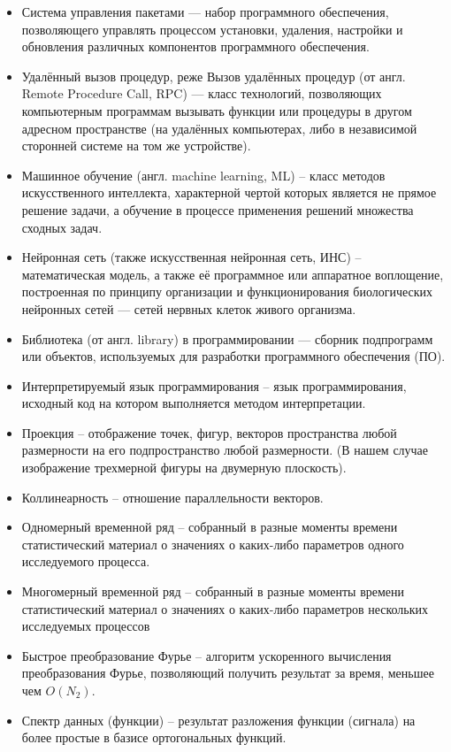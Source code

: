 \begin{itemize}
    \item Система управления пакетами — набор программного обеспечения, позволяющего управлять процессом установки, удаления, настройки и обновления различных компонентов программного обеспечения.
    \item Удалённый вызов процедур, реже Вызов удалённых процедур (от англ. Remote Procedure Call, RPC) — класс технологий, позволяющих компьютерным программам вызывать функции или процедуры в другом адресном пространстве (на удалённых компьютерах, либо в независимой сторонней системе на том же устройстве).
    \item Машинное обучение (англ. machine learning, ML) -- класс методов искусственного интеллекта, характерной чертой которых является не прямое решение задачи, а обучение в процессе применения решений множества сходных задач.
    \item Нейронная сеть (также искусственная нейронная сеть, ИНС) -- математическая модель, а также её программное или аппаратное воплощение, построенная по принципу организации и функционирования биологических нейронных сетей — сетей нервных клеток живого организма.
    \item Библиотека (от англ. library) в программировании — сборник подпрограмм или объектов, используемых для разработки программного обеспечения (ПО).
    \item Интерпретируемый язык программирования -- язык программирования, исходный код на котором выполняется методом интерпретации.
    \item Проекция -- отображение точек, фигур, векторов пространства любой размерности на его подпространство любой размерности. (В нашем случае изображение трехмерной фигуры на двумерную плоскость).
    \item Коллинеарность -- отношение параллельности векторов.
    \item Одномерный временной ряд -- собранный в разные моменты времени статистический материал о значениях о каких-либо параметров одного исследуемого процесса.
    \item Многомерный временной ряд -- собранный в разные моменты времени статистический материал о значениях о каких-либо параметров нескольких исследуемых процессов
    \item Быстрое преобразование Фурье -- алгоритм ускоренного вычисления преобразования Фурье, позволяющий получить результат за время, меньшее чем $O(N_2)$.
    \item Спектр данных (функции) -- результат разложения функции (сигнала) на более простые в базисе ортогональных функций.

\end{itemize}
